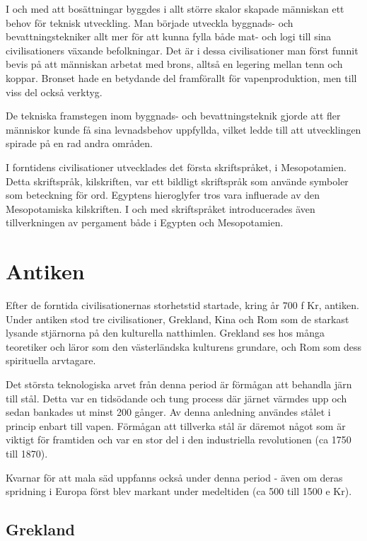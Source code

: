 \documentclass[a4paper,12pt,fleqn]{article}
\begin{document}
I och med att bosättningar byggdes i allt större skalor skapade människan ett behov för teknisk utveckling. Man började utveckla byggnads- och bevattningstekniker allt mer för att kunna fylla både mat- och logi till sina civilisationers växande befolkningar. Det är i dessa civilisationer man först funnit bevis på att människan arbetat med brons, alltså en legering mellan tenn och koppar. Bronset hade en betydande del framförallt för vapenproduktion, men till viss del också verktyg. 

De tekniska framstegen inom byggnads- och bevattningsteknik gjorde att fler människor kunde få sina levnadsbehov uppfyllda, vilket ledde till att utvecklingen spirade på en rad andra områden. 

I forntidens civilisationer utvecklades det första skriftspråket, i Mesopotamien. Detta skriftspråk, kilskriften, var ett bildligt skriftspråk som använde symboler som beteckning för ord. Egyptens hieroglyfer tros vara influerade av den Mesopotamiska kilskriften. I och med skriftspråket introducerades även tillverkningen av pergament både i Egypten och Mesopotamien. 

\newpage
\section{Antiken}

Efter de forntida civilisationernas storhetstid startade, kring år 700 f Kr, antiken. Under antiken stod tre civilisationer, Grekland, Kina och Rom som de starkast lysande stjärnorna på den kulturella natthimlen. Grekland ses hos många teoretiker och läror som den västerländska kulturens grundare, och Rom som dess spirituella arvtagare. 

Det största teknologiska arvet från denna period är förmågan att behandla järn till stål. Detta var en tidsödande och tung process där järnet värmdes upp och sedan bankades ut minst 200 gånger. Av denna anledning användes stålet i princip enbart till vapen. Förmågan att tillverka stål är däremot något som är viktigt för framtiden och var en stor del i den industriella revolutionen (ca 1750 till 1870). 

Kvarnar för att mala säd uppfanns också under denna period - även om deras spridning i Europa först blev markant under medeltiden (ca 500 till 1500 e Kr). 

\subsection{Grekland}
\end{document}
